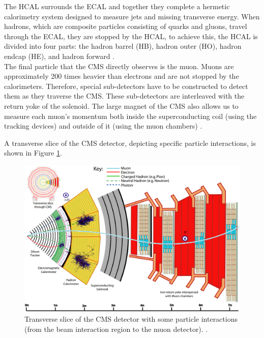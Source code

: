 The HCAL surrounds the ECAL and together they complete a hermetic calorimetry system designed to measure jets and missing transverse energy. When hadrons, which are composite particles consisting of quarks and gluons, travel through the ECAL, they are stopped by the HCAL, to achieve  this, the HCAL is divided into four parts: the hadron barrel (HB), hadron outer (HO), hadron endcap (HE), and hadron forward \cite{det_summary}.\\

The final particle that the CMS directly observes is the muon. Muons are approximately 200 times heavier than electrons and are not stopped by the calorimeters. Therefore, special sub-detectors have to be constructed to detect them as they traverse the CMS. These sub-detectors are interleaved with the return yoke of the solenoid. The large magnet of the CMS also allows us to measure each muon's momentum both inside the superconducting coil (using the tracking devices) and outside of it (using the muon chambers) \cite{det_summary}. 

A transverse slice of the CMS detector, depicting specific particle interactions, is shown in Figure \ref{slice_CMS}.


\begin{center}
  \begin{figure}[ht]
    \centering
    \includegraphics[scale=.3]{Chapter2/slice_det.png}
    \caption[Transverse slice fo CMS detector]{Transverse slice of the CMS detector with some particle interactions (from the beam interaction region to the muon detector).  \cite{det_summary}.}
    \label{slice_CMS}
  \end{figure}
\end{center}

